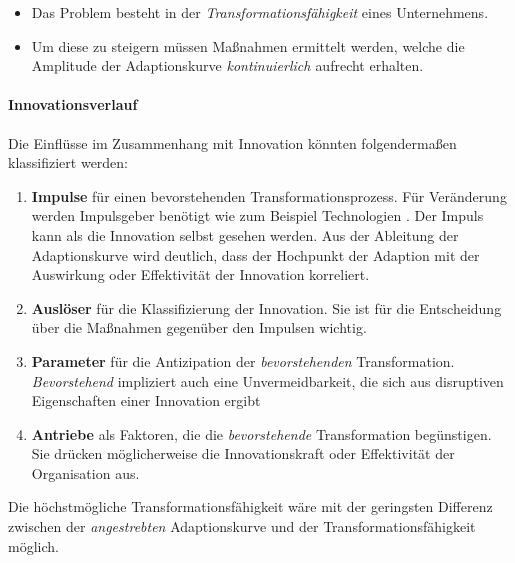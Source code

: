 \begin{itemize}
    \item Das Problem besteht in der \emph{Transformationsfähigkeit} eines Unternehmens. 
    \item Um diese zu steigern müssen Maßnahmen ermittelt werden, welche die Amplitude der Adaptionskurve \cite[Abb. 2.1]{Alt2017} \emph{kontinuierlich \cite{Bussmann2006}} aufrecht erhalten. 
\end{itemize}

\paragraph{Innovationsverlauf}
Die Einflüsse im Zusammenhang mit Innovation könnten folgendermaßen klassifiziert werden:
\begin{enumerate}
    \item \textbf{Impulse} für einen bevorstehenden Transformationsprozess. Für Veränderung werden Impulsgeber benötigt wie zum Beispiel Technologien \cite{Bussmann2006, Gupta:2017}. Der Impuls kann als die Innovation selbst gesehen werden. Aus der Ableitung der Adaptionskurve \cite[Abb. 2.1]{Alt2017} wird deutlich, dass der Hochpunkt der Adaption mit der Auswirkung oder Effektivität der Innovation korreliert.
    \item \textbf{Auslöser} für die Klassifizierung der Innovation. Sie ist für die Entscheidung über die Maßnahmen gegenüber den Impulsen wichtig.
    \item \textbf{Parameter} für die Antizipation der \emph{bevorstehenden} Transformation. \emph{Bevorstehend} impliziert auch eine Unvermeidbarkeit, die sich aus disruptiven Eigenschaften einer Innovation ergibt \cite{Fernandez:2020, Gupta:2017}
    \item \textbf{Antriebe} als Faktoren, die die \emph{bevorstehende} Transformation begünstigen. Sie drücken möglicherweise die Innovationskraft oder Effektivität der Organisation aus.
\end{enumerate}
Die höchstmögliche Transformationsfähigkeit wäre mit der geringsten Differenz zwischen der \emph{angestrebten} Adaptionskurve \cite[Abb. 2.1]{Alt2017} und der Transformationsfähigkeit möglich.

